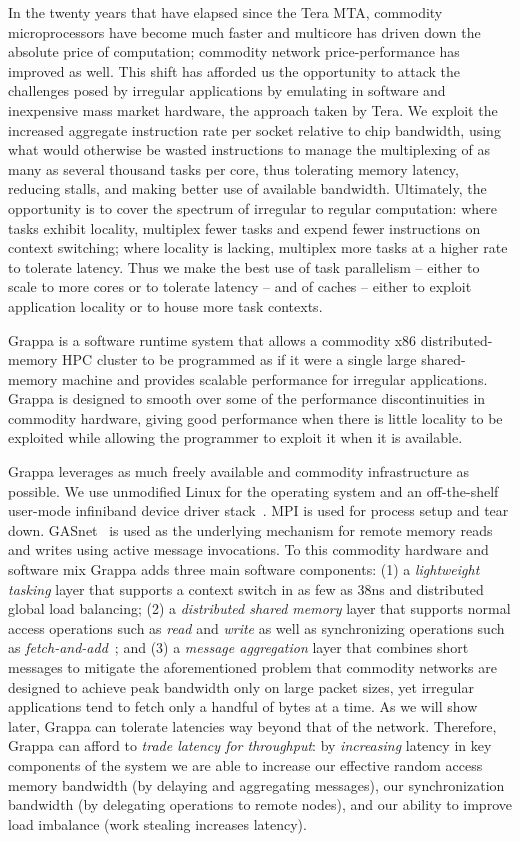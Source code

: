 In the twenty years that have elapsed since the Tera MTA, commodity microprocessors have become much faster and multicore has driven down the absolute price of computation; commodity network price-performance has improved as well. This shift has afforded us the opportunity to attack the challenges posed by irregular applications by emulating in software and inexpensive mass market hardware, the approach taken by Tera. We exploit the increased aggregate instruction rate per socket relative to chip bandwidth, using what would otherwise be wasted instructions to manage the multiplexing of as many as several thousand tasks per core, thus tolerating memory latency, reducing stalls, and making better use of available bandwidth. Ultimately, the opportunity is to cover the spectrum of irregular to regular computation: where tasks exhibit locality, multiplex fewer tasks and expend fewer instructions on context switching; where locality is lacking, multiplex more tasks at a higher rate to tolerate latency. Thus we make the best use of task parallelism -- either to scale to more cores or to tolerate latency -- and of caches -- either to exploit application locality or to house more task contexts.

Grappa is a software runtime system that allows a commodity x86 distributed-memory HPC cluster to be programmed as if it were a single large shared-memory machine and provides scalable performance for irregular applications. Grappa is designed to smooth over some of the performance discontinuities in commodity hardware, giving good performance when there is little locality to be exploited while allowing the programmer to exploit it when it is available.

Grappa leverages as much freely available and commodity infrastructure as possible. We use unmodified Linux for the operating system and an off-the-shelf user-mode infiniband device driver stack~\cite{OFED}. MPI is used for process setup and tear down. GASnet~\cite{gasnet} is used as the underlying mechanism for remote memory reads and writes using active message invocations. To this commodity hardware and software mix Grappa adds three main software components: (1) a \emph{lightweight tasking\/} layer that supports a context switch in as few as 38ns and distributed global load balancing; (2) a \emph{distributed shared memory\/} layer that supports normal access operations such as \emph{read\/} and \emph{write\/} as well as synchronizing operations such as \emph{fetch-and-add\/}~\cite{fetchandadd}; and (3) a \emph{message aggregation\/} layer that combines short messages to mitigate the aforementioned problem that commodity networks are designed to achieve peak bandwidth only on large packet sizes, yet irregular applications tend to fetch only a handful of bytes at a time. As we will show later, Grappa can tolerate latencies way beyond that of the network. Therefore, Grappa can afford to \emph{trade latency for throughput\/}: by {\em increasing\/} latency in key components of the system we are able to increase our effective random access memory bandwidth (by delaying and aggregating messages), our synchronization bandwidth (by delegating operations to remote nodes), and our ability to improve load imbalance (work stealing increases latency).

